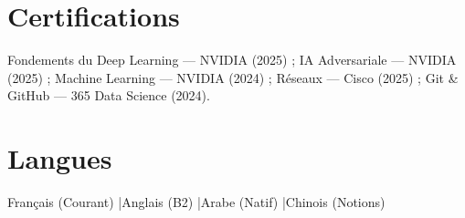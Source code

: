 \documentclass[a4paper,10pt]{article}
\begin{document}
\section{Certifications}
Fondements du Deep Learning --- NVIDIA (2025) ; IA Adversariale --- NVIDIA (2025) ; Machine Learning --- NVIDIA (2024) ; Réseaux --- Cisco (2025) ; Git \& GitHub --- 365 Data Science (2024).
\section{Langues}
Français (Courant) \quad|\quad Anglais (B2) \quad|\quad Arabe (Natif) \quad|\quad Chinois (Notions)
\end{document}
